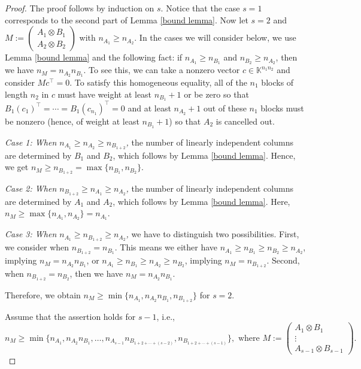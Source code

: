 \documentclass[10pt,a4paper]{amsart}
\newcommand{\K}{\mathbb{K}}
\begin{document}
\begin{proof}
The proof follows by induction on $s$. Notice that the case $s=1$ corresponds to the second part of Lemma \ref{bound lemma}. Now let $s=2$ and $M:=\begin{pmatrix}
A_1 \otimes B_1\\
A_2 \otimes B_2
\end{pmatrix}$ with $n_{A_1}\geq n_{A_2}$. In the cases we will consider below, we use Lemma \ref{bound lemma} and the following fact: if $n_{A_1}\geq n_{B_1}$ and $n_{B_2}\geq n_{A_2}$, then we have $n_M= n_{A_2} n_{B_1}$. To see this, we can take a nonzero vector $c\in\K^{n_1n_2}$ and consider $Mc^\top = 0$. To satisfy this homogeneous equality, all of the $n_1$ blocks of length $n_2$ in $c$ must have weight at least $n_{B_1}+1$ or be zero so that $B_1(c_1)^\top=\cdots=B_1(c_{n_1})^\top=0$ and at least $n_{A_2}+1$ out of these $n_1$ blocks must be nonzero (hence, of weight at least $n_{B_1}+1$) so that $A_2$ is cancelled out. 

\emph{Case 1: When $n_{A_1}\geq n_{A_2}\geq n_{B_{1+2}}$,} the number of linearly independent columns are determined by $B_1$ and $B_2$, which follows by Lemma \ref{bound lemma}. Hence, we get $n_M\geq n_{B_{1+2}}=\max\{n_{B_1},n_{B_2}\}$.

\emph{Case 2: When $n_{B_{1+2}}\geq n_{A_1}\geq n_{A_2}$,} the number of linearly independent columns are determined by $A_1$ and $A_2$, which follows by Lemma \ref{bound lemma}. Here, $n_M\geq\max\{n_{A_1},n_{A_2}\}=n_{A_1}$.

\emph{Case 3: When $n_{A_1}\geq n_{B_{1+2}}\geq n_{A_2}$,} we have to distinguish two possibilities. First, we consider when $n_{B_{1+2}}=n_{B_1}$. This means we either have $n_{A_1}\geq n_{B_1}\geq n_{B_2}\geq n_{A_2}$, implying $n_M= n_{A_2} n_{B_1}$, or $n_{A_1}\geq n_{B_1}\geq n_{A_2}\geq n_{B_2}$, implying $n_M=n_{B_{1+2}}$. Second, when $n_{B_{1+2}}=n_{B_2}$, then we have $n_M= n_{A_2} n_{B_1}$.

Therefore, we obtain $n_M\geq\min\{n_{A_1}, n_{A_2} n_{B_1}, n_{B_{1+2}}\}$ for $s=2$.

Assume that the assertion holds for $s-1$, i.e., 
\begin{equation}\label{ind-hyp}
n_M\geq \min\{n_{A_1},n_{A_2}n_{B_1}, \ldots, n_{A_{s-1}}n_{B_{1+2+\cdots +(s-2)}},n_{B_{1+2+\cdots +(s-1)}}\},
\mbox{\ where\ } M:=\begin{pmatrix}
A_1 \otimes B_1\\
\vdots\\
A_{s-1} \otimes B_{s-1}
\end{pmatrix}.
\end{equation}


\end{proof}
\end{document}
